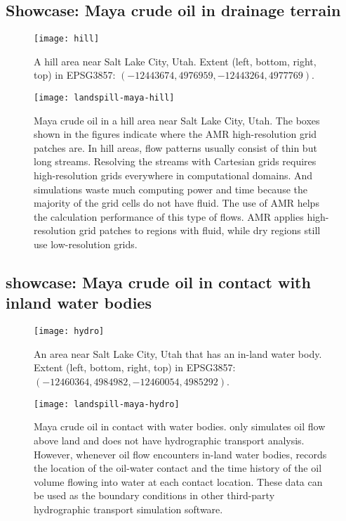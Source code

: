\subsection{Showcase: Maya crude oil in drainage terrain}

\begin{figure}
    \centering
    \texttt{[image: hill]}
    \caption{%
        A hill area near Salt Lake City, Utah. %
        Extent (left, bottom, right, top) in EPSG3857: $(-12443674, 4976959, -12443264, 4977769)$.
    }\label{fig:hill-terrain-satellite}
\end{figure}

\begin{figure*}
    \texttt{[image: landspill-maya-hill]}
    \caption{%
        Maya crude oil in a hill area near Salt Lake City, Utah. %
        The boxes shown in the figures indicate where the AMR high-resolution grid patches are. %
        In hill areas, flow patterns usually consist of thin but long streams. %
        Resolving the streams with Cartesian grids requires high-resolution grids everywhere in computational domains. %
        And simulations waste much computing power and time because the majority of the grid cells do not have fluid. %
        The use of AMR helps the calculation performance of this type of flows. %
        AMR applies high-resolution grid patches to regions with fluid, while dry regions still use low-resolution grids.%
    }\label{fig:landspill-maya-hill}
\end{figure*}

\subsection{showcase: Maya crude oil in contact with inland water bodies}

\begin{figure}
    \centering
    \texttt{[image: hydro]}
    \caption{%
        An area near Salt Lake City, Utah that has an in-land water body. %
        Extent (left, bottom, right, top) in EPSG3857: $(-12460364, 4984982, -12460054, 4985292)$.
    }\label{fig:hydro-terrain-satellite}
\end{figure}

\begin{figure*}
    \texttt{[image: landspill-maya-hydro]}
    \caption{%
        Maya crude oil in contact with water bodies. %
        \geoclawlandspill{} only simulates oil flow above land and does not have hydrographic transport analysis. %
        However, whenever oil flow encounters in-land water bodies, \geoclawlandspill{} records the location of the oil-water contact and the time history of the oil volume flowing into water at each contact location.  %
        These data can be used as the boundary conditions in other third-party hydrographic transport simulation software.%
    }\label{fig:landspill-maya-hydro}
\end{figure*}
